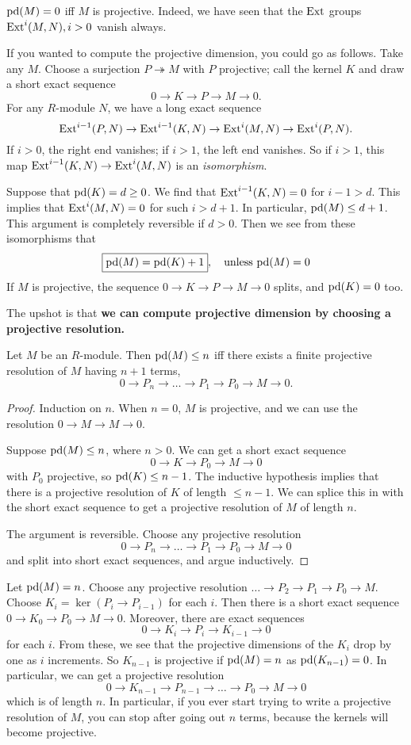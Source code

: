 \begin{remark}
$\mathrm{pd}(M) = 0$ iff $M$ is projective. Indeed, we have seen that
the $\operatorname{Ext}$ groups
$\operatorname{Ext}^i(M,N), i >0$
vanish always.
\end{remark}

If you wanted to compute the projective dimension, you could go
as follows.
Take any $M$. Choose a surjection $P \twoheadrightarrow M$ with
$P$ projective;
call the kernel $K$ and draw a short exact sequence
\[ 0 \to K \to P \to M \to 0.  \]
For any $R$-module $N$, we have a long exact sequence
\[ \operatorname{Ext}^{i-1}(P,N) \to \operatorname{Ext}^{i-1}(K,N) \to \operatorname{Ext}^i(M,N) \to
\operatorname{Ext}^i(P, N). \]
If $i >0$, the right end vanishes; if $i >1$, the left end
vanishes. So if $i
>1$, this map $\operatorname{Ext}^{i-1}(K,N) \to \operatorname{Ext}^i(M,N)$ is an
\emph{isomorphism}.

Suppose that $\mathrm{pd}(K) = d \geq 0$. We find that
$\operatorname{Ext}^{i-1}(K,N)=0$ for $i-1
> d$.
This implies that $\operatorname{Ext}^i(M,N) = 0$ for such $i > d+1$. In
particular, $\mathrm{pd}(M)
\leq d+1$.
This argument is completely reversible if $d >0$.
Then we see from these isomorphisms that
\[ \boxed{\mathrm{pd}(M) = \mathrm{pd}(K)+1}, \quad \mathrm{unless} \ \mathrm{pd}(M)=0
\]
If $M$ is projective, the sequence $0 \to K \to P \to M \to 0$
splits, and
$\mathrm{pd}(K)=0$ too.

The upshot is that \textbf{we can compute projective dimension
by choosing a
projective resolution.}
\begin{proposition}
Let $M$ be an $R$-module. Then $\mathrm{pd}(M) \leq n$ iff there exists
a finite
projective resolution of $M$ having $n+1$ terms,
\[ 0 \to P_n \to \dots \to P_1 \to P_0 \to M \to 0.  \]
\end{proposition}
\begin{proof}
Induction on $n$. When $n = 0$, $M$ is projective, and we can
use the
resolution $0 \to M \to M \to 0$.

Suppose $\mathrm{pd}(M) \leq n$, where $n >0$. We can get a short exact
sequence
\[ 0 \to K \to P_0 \to M \to 0  \]
with $P_0$ projective, so $\mathrm{pd}(K) \leq n-1$. The inductive
hypothesis implies
that there is a projective resolution of $K$ of length $\leq
n-1$. We can
splice this in with the short exact sequence to get a projective
resolution of
$M$ of length $n$.

The argument is reversible. Choose any projective resolution
\[  0 \to P_n \to \dots \to P_1 \to P_0 \to M \to 0 \]
and split into short exact sequences, and argue inductively.
\end{proof}


Let $\mathrm{pd}(M) = n$. Choose any projective resolution $\dots \to
P_2 \to P_1 \to
P_0 \to M$. Choose $K_i = \ker(P_i \to P_{i-1})$ for each $i$.
Then there is a short exact sequence $0 \to K_0 \to P_0 \to M
\to 0$. Moreover,
there are exact sequences
\[ 0 \to K_i \to P_i \to K_{i-1} \to 0  \]
for each $i$. From these, we see that the projective dimensions
of the $K_i$
drop by one as $i$ increments. So $K_{n-1}$ is projective if
$\mathrm{pd}(M) = n$ as
$\mathrm{pd}(K_{n-1})=0$. In particular, we can get a projective
resolution
\[ 0 \to K_{n-1} \to P_{n-1} \to \dots \to P_0 \to M \to 0  \]
which is of length $n$.
In particular, if you ever start trying to write a projective
resolution of
$M$, you can stop after going out $n$ terms, because the kernels
will become
projective.


